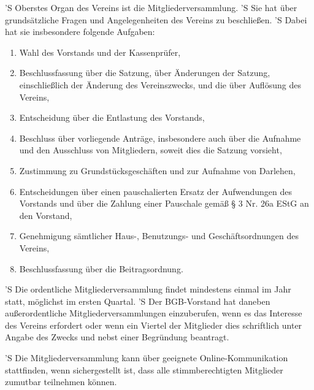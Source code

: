 \documentclass[a4paper,10pt]{scrreprt}
\begin{document}
\begin{contract}

'S Oberstes Organ des Vereins ist die Mitgliederversammlung.
'S Sie hat über grundsätzliche Fragen und Angelegenheiten des Vereins zu
beschließen.
'S Dabei hat sie insbesondere folgende Aufgaben:
\begin{enumerate}
	\item Wahl des Vorstands und der Kassenprüfer,
	\item Beschlussfassung über die Satzung, über Änderungen der Satzung,
	      einschließlich der Änderung des Vereinszwecks, und die über
		  Auflösung des Vereins,
	\item Entscheidung über die Entlastung des Vorstands,
	\item Beschluss über vorliegende Anträge, insbesondere auch über die
	      Aufnahme und den Ausschluss von Mitgliedern, soweit dies die Satzung
		  vorsieht,
	\item Zustimmung zu Grundstücksgeschäften und zur Aufnahme von Darlehen,
	\item Entscheidungen über einen pauschalierten Ersatz der Aufwendungen des
	      Vorstands und über die Zahlung einer Pauschale gemäß § 3 Nr. 26a EStG
		  an den Vorstand,
	\item Genehmigung sämtlicher Haus-, Benutzungs- und Geschäftsordnungen des
	      Vereins,
	\item Beschlussfassung über die Beitragsordnung.
\end{enumerate}

'S Die ordentliche Mitgliederversammlung findet mindestens einmal im Jahr
statt, möglichst im ersten Quartal.
'S Der BGB-Vorstand hat daneben außerordentliche Mitgliederversammlungen
einzuberufen, wenn es das Interesse des Vereins erfordert oder wenn ein Viertel
der Mitglieder dies schriftlich unter Angabe des Zwecks und nebst einer
Begründung beantragt.

'S Die Mitgliederversammlung kann über geeignete Online-Kommunikation
stattfinden, wenn sichergestellt ist, dass alle stimmberechtigten Mitglieder
zumutbar teilnehmen können.


\end{contract}
\end{document}
